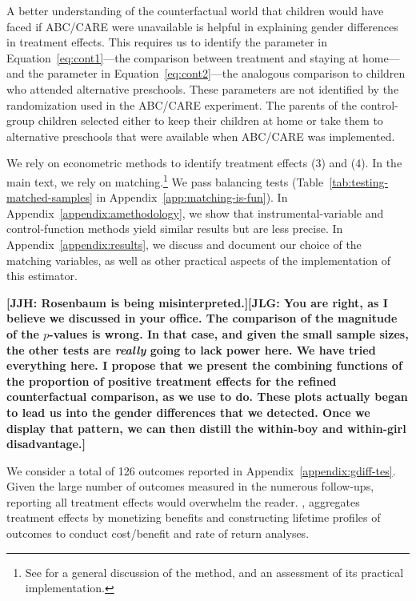 
A better understanding of the counterfactual world that children would have faced if ABC/CARE were unavailable is helpful in explaining gender differences in treatment effects. This requires us to identify the parameter in Equation~\eqref{eq:cont1}---the comparison between treatment and staying at home---and the parameter in Equation~\eqref{eq:cont2}---the analogous comparison to children who attended alternative preschools. These parameters are not identified by the randomization used in the ABC/CARE experiment. The parents of the control-group children selected either to keep their children at home or take them to alternative preschools that were available when ABC/CARE was implemented.

We rely on econometric methods to identify treatment effects (3) and (4). In the main text, we rely on matching.\footnote{See \citet{Heckman_Ichimura_etal_1998_REStud} for a general discussion of the method, and an assessment of its practical implementation.} We pass balancing tests (Table~\ref{tab:testing-matched-samples} in Appendix~\ref{app:matching-is-fun}). In Appendix~\ref{appendix:amethodology}, we show that instrumental-variable and control-function methods yield similar results but are less precise. In Appendix~\ref{appendix:results}, we discuss and document our choice of the matching variables, as well as other practical aspects of the implementation of this estimator.

\textbf{[JJH: Rosenbaum is being misinterpreted.][JLG: You are right, as I believe we discussed in your office. The comparison of the magnitude of the $p$-values is wrong. In that case, and given the small sample sizes, the other tests are \textit{really} going to lack power here. We have tried everything here. I propose that we present the combining functions of the proportion of positive treatment effects for the refined counterfactual comparison, as we use to do. These plots actually began to lead us into the gender differences that we detected. Once we display that pattern, we can then distill the within-boy and within-girl disadvantage.]}


We consider a total of 126 outcomes reported in Appendix~\ref{appendix:gdiff-tes}. Given the large number of outcomes measured in the numerous follow-ups, reporting all treatment effects would overwhelm the reader. \citet{Garcia_Heckman_Leaf_etal_2017_Comp_CBA_Unpublished}, aggregates treatment effects by monetizing benefits and constructing lifetime profiles of outcomes to conduct cost/benefit and rate of return analyses. 

